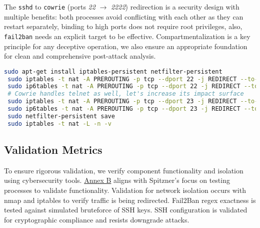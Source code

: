 \documentclass{cls/ULBreport}
\begin{document}
        The \texttt{sshd} to \texttt{cowrie} ({ports \textit{22}} $\rightarrow$ \textit{2222}) redirection is a security design with multiple benefits: both processes avoid conflicting with each other as they can restart separately, binding to high ports does not require root privileges, also, \texttt{fail2ban} needs an explicit target to be effective. Compartmentalization is a key principle for any deceptive operation, we also ensure an appropriate foundation for clean and comprehensive post-attack analysis.
        \begin{lstlisting}[language=bash,caption={Traffic Redirection to Cowrie}]
 sudo apt-get install iptables-persistent netfilter-persistent
 sudo iptables -t nat -A PREROUTING -p tcp --dport 22 -j REDIRECT --to-port 2222
 sudo ip6tables -t nat -A PREROUTING -p tcp --dport 22 -j REDIRECT --to-port 2222
 # Cowrie handles telnet as well, let's increase its impact surface
 sudo iptables -t nat -A PREROUTING -p tcp --dport 23 -j REDIRECT --to-port 2323
 sudo ip6tables -t nat -A PREROUTING -p tcp --dport 23 -j REDIRECT --to-port 2323
 sudo netfilter-persistent save
 sudo iptables -t nat -L -n -v\end{lstlisting}
        

        
        \subsection{Validation Metrics}  
        \label{sec:validation}  
        
        To ensure rigorous validation, we verify component functionality and isolation using cybersecurity tools. \hyperref[annexes:network]{Annex B} aligns with Spitzner's focus on testing processes to validate functionality. Validation for network isolation occurs with nmap and iptables to verify traffic is being redirected. Fail2Ban regex exactness is tested against simulated bruteforce of SSH keys. SSH configuration is validated for cryptographic compliance and resists downgrade attacks.
        
\end{document}
